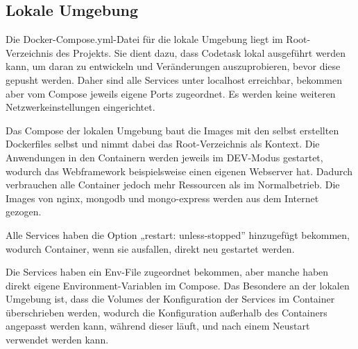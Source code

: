 \subsection{Lokale Umgebung}

Die Docker-Compose.yml-Datei für die lokale Umgebung liegt im Root-Verzeichnis des Projekts.
Sie dient dazu, dass Codetask lokal ausgeführt werden kann, um daran zu entwickeln und Veränderungen auszuprobieren, bevor diese gepusht werden.
Daher sind alle Services unter localhost erreichbar, bekommen aber vom Compose jeweils eigene Ports zugeordnet. Es werden keine weiteren Netzwerkeinstellungen eingerichtet.

Das Compose der lokalen Umgebung baut die Images mit den selbst erstellten Dockerfiles selbst und nimmt dabei das Root-Verzeichnis als Kontext.
Die Anwendungen in den Containern werden jeweils im DEV-Modus gestartet, wodurch das Webframework beispielsweise einen eigenen Webserver hat. Dadurch verbrauchen alle Container jedoch mehr Ressourcen als im Normalbetrieb.
Die Images von nginx, mongodb und mongo-express werden aus dem Internet gezogen. 

Alle Services haben die Option „restart: unless-stopped” hinzugefügt bekommen, wodurch Container, wenn sie ausfallen, direkt neu gestartet werden.

Die Services haben ein Env-File zugeordnet bekommen, aber manche haben direkt eigene Environment-Variablen im Compose. Das Besondere an der lokalen Umgebung ist, dass die Volumes der Konfiguration der Services im Container überschrieben werden, wodurch die Konfiguration außerhalb des Containers angepasst werden kann, während dieser läuft, und nach einem Neustart verwendet werden kann.